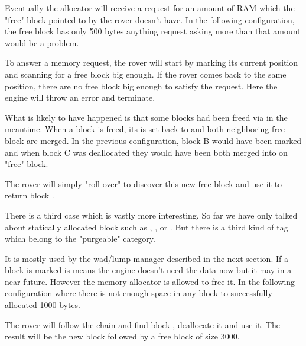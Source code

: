 Eventually the allocator will receive a request for an amount of RAM which the "free" block pointed to by the rover doesn't have. In the following configuration, the free block has only 500 bytes anything request asking more than that amount would be a problem.\\
\par
{}
\par
To answer a memory request, the rover will start by marking its current position and scanning for a free block big enough. If the rover comes back to the same position, there are no free block big enough to satisfy the request. Here the engine will throw an error and terminate.\\
\par
What is likely to have happened is that some blocks had been freed via  in the meantime. When a block is freed, its  is set back to  and both neighboring free block are merged. In the previous configuration, block B would have been marked  and when block C was deallocated they would have been both merged into on "free" block.\\
\par
{}
\par
The rover will simply "roll over" to discover this new free block and use it to return block .\\
\par
{}
\par
There is a third case which is vastly more interesting. So far we have only talked about statically allocated block such as , , or . But there is a third kind of tag which belong to the "purgeable" category.\\
\par
 It is mostly used by the wad/lump manager described in the next section. If a block is marked  is means the engine doesn't need the data now but it may in a near future. However the memory allocator is allowed to free it. In the following configuration where there is not enough space in any block to successfully allocated 1000 bytes.\\
\par
{}
\par
The rover will follow the chain and find block , deallocate it and use it. The result will be the new block  followed by a free block of size 3000.\\
\par
{}
\par


